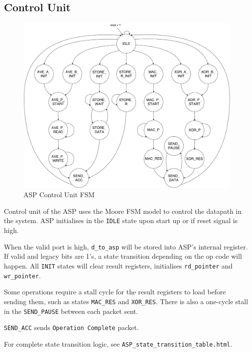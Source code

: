 \documentclass[]{article}
\begin{document}
	\subsection{Control Unit}\label{header-c5}
	
	\begin{figure}[H]
		\centering
		\includegraphics[width = 5.5in]{asp_fsm}
		\caption{ASP Control Unit FSM}
		\label{fig:asp_fsm}
	\end{figure}
	
	Control unit of the ASP uses the Moore FSM model to control the datapath in the system. ASP initialises in the \texttt{IDLE} state upon start up or if reset signal is high. \par 
	
	When the valid port is high, \texttt{d\_to\_asp} will be stored into ASP's internal register. If valid and legacy bits are 1's, a state transition depending on the op code will happen. All \texttt{INIT} states will clear result registers, initialises \texttt{rd\_pointer} and \texttt{wr\_pointer}. \par 
	
	Some operations require a stall cycle for the result registers to load before sending them, such as states \texttt{MAC\_RES} and \texttt{XOR\_RES}. There is also a one-cycle stall in the \texttt{SEND\_PAUSE} between each packet sent.
	
	\texttt{SEND\_ACC} sends \texttt{Operation Complete} packet.
	
	For complete state transition logic, see \texttt{ASP\_state\_transition\_table.html}.
	
\end{document}

